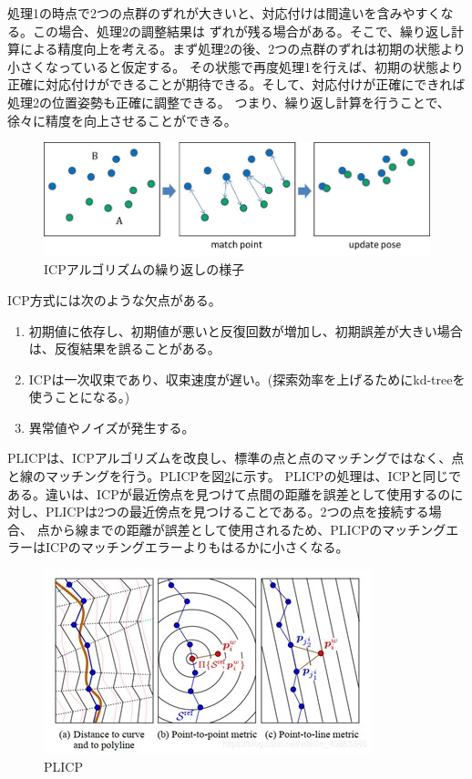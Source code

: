 処理1の時点で2つの点群のずれが大きいと、対応付けは間違いを含みやすくなる。この場合、処理2の調整結果は
ずれが残る場合がある。そこで、繰り返し計算による精度向上を考える。まず処理2の後、2つの点群のずれは初期の状態より小さくなっていると仮定する。
その状態で再度処理1を行えば、初期の状態より正確に対応付けができることが期待できる。そして、対応付けが正確にできれば処理2の位置姿勢も正確に調整できる。
つまり、繰り返し計算を行うことで、徐々に精度を向上させることができる。

\begin{figure}[h]
  \begin{center}
    \includegraphics[width=.8\linewidth]{img/slam_25.jpg}
    \caption{ICPアルゴリズムの繰り返しの様子}
    \label{slam:icp_process}
  \end{center}
\end{figure}

ICP方式には次のような欠点がある。
\begin{enumerate}
  \item 初期値に依存し、初期値が悪いと反復回数が増加し、初期誤差が大きい場合は、反復結果を誤ることがある。
  \item ICPは一次収束であり、収束速度が遅い。(探索効率を上げるためにkd-treeを使うことになる。)
  \item 異常値やノイズが発生する。
\end{enumerate}

PLICPは、ICPアルゴリズムを改良し、標準の点と点のマッチングではなく、点と線のマッチングを行う。PLICPを図\ref{slam:plicp}に示す。
PLICPの処理は、ICPと同じである。違いは、ICPが最近傍点を見つけて点間の距離を誤差として使用するのに対し、PLICPは2つの最近傍点を見つけることである。2つの点を接続する場合、
点から線までの距離が誤差として使用されるため、PLICPのマッチングエラーはICPのマッチングエラーよりもはるかに小さくなる。

\begin{figure}[h]
  \begin{center}
    \includegraphics[width=.8\linewidth]{img/slam_26.jpg}
    \caption{PLICP\cite{slam:plicp}}
    \label{slam:plicp}
  \end{center}
\end{figure}

